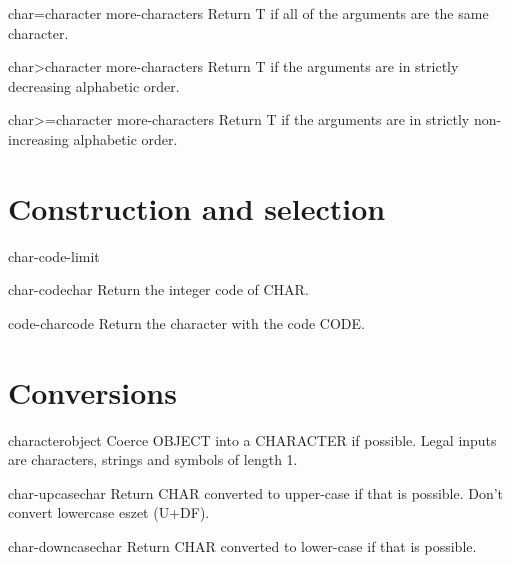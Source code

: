 \documentclass[10pt,english]{book}
\begin{document}
\begin{function}{char=}{character \rest more-characters}
  Return T if all of the arguments are the same character.
\end{function}

\begin{function}{char>}{character \rest more-characters}
  Return T if the arguments are in strictly decreasing alphabetic order.
\end{function}

\begin{function}{char>=}{character \rest more-characters}
  Return T if the arguments are in strictly non-increasing alphabetic order.
\end{function}

\section{Construction and selection}
\label{sec:character-constr-select}

\begin{constant}{char-code-limit}{}
  
\end{constant}

\begin{function}{char-code}{char}
  Return the integer code of CHAR.
\end{function}

\begin{function}{code-char}{code}
  Return the character with the code CODE.
\end{function}

\section{Conversions}
\label{sec:character-conversions}

\begin{function}{character}{object}
  Coerce OBJECT into a CHARACTER if possible. Legal inputs are
  characters, strings and symbols of length 1.
\end{function}

\begin{function}{char-upcase}{char}
  Return CHAR converted to upper-case if that is possible.  Don't convert
   lowercase eszet (U+DF).
\end{function}

\begin{function}{char-downcase}{char}
  Return CHAR converted to lower-case if that is possible.
\end{function}
\end{document}
